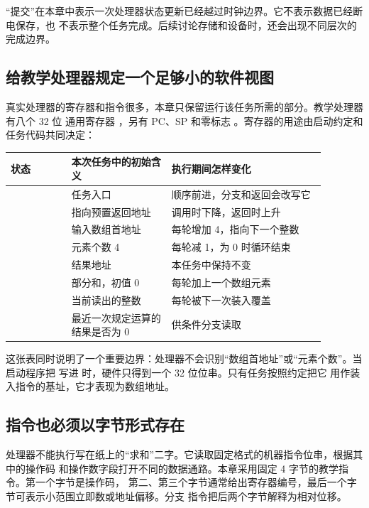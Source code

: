 “提交”在本章中表示一次处理器状态更新已经越过时钟边界。它不表示数据已经断电保存，也
不表示整个任务完成。后续讨论存储和设备时，还会出现不同层次的完成边界。

\subsection{给教学处理器规定一个足够小的软件视图}

真实处理器的寄存器和指令很多，本章只保留运行该任务所需的部分。教学处理器有八个 32 位
通用寄存器 ，另有 PC、SP 和零标志 。寄存器的用途由启动约定和
任务代码共同决定：

\begin{longtable}{|L{0.17\linewidth}|L{0.28\linewidth}|L{0.43\linewidth}|}
\hline
{}
状态 & 本次任务中的初始含义 & 执行期间怎样变化 \\ \hline
{} & 任务入口  & 顺序前进，分支和返回会改写它 \\ \hline
{} & 指向预置返回地址 & 调用时下降，返回时上升 \\ \hline
{} & 输入数组首地址  & 每轮增加 4，指向下一个整数 \\ \hline
{} & 元素个数 4 & 每轮减 1，为 0 时循环结束 \\ \hline
{} & 结果地址  & 本任务中保持不变 \\ \hline
{} & 部分和，初值 0 & 每轮加上一个数组元素 \\ \hline
{} & 当前读出的整数 & 每轮被下一次装入覆盖 \\ \hline
{} & 最近一次规定运算的结果是否为 0 & 供条件分支读取 \\ \hline
\end{longtable}

这张表同时说明了一个重要边界：处理器不会识别“数组首地址”或“元素个数”。当启动程序把
 写进  时，硬件只得到一个 32 位位串。只有任务按照约定把它
用作装入指令的基址，它才表现为数组地址。

\subsection{指令也必须以字节形式存在}

处理器不能执行写在纸上的“求和”二字。它读取固定格式的机器指令位串，根据其中的操作码
和操作数字段打开不同的数据通路。本章采用固定 4 字节的教学指令。第一个字节是操作码，
第二、第三个字节通常给出寄存器编号，最后一个字节可表示小范围立即数或地址偏移。分支
指令把后两个字节解释为相对位移。

